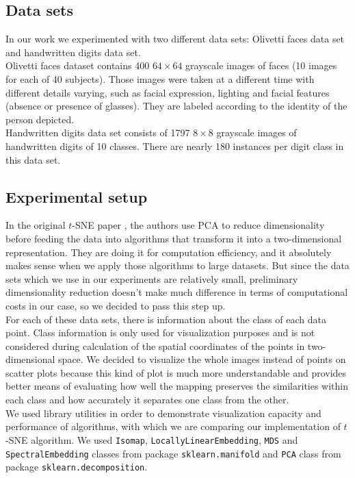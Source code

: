 \subsection{Data sets}

In our work we experimented with two different data sets: Olivetti faces data set and handwritten digits data set.\\

Olivetti faces dataset contains 400 $64 \times 64$ grayscale images of faces (10 images for each of 40 subjects). Those images were taken at a different time with different details varying, such as facial expression, lighting and facial features (absence or presence of glasses). They are labeled according to the identity of the person depicted.\\

Handwritten digits data set consists of 1797 $8 \times 8$ grayscale images of handwritten digits of 10 classes. There are nearly 180 instances per digit class in this data set.

\subsection{Experimental setup}

In the original $t$-SNE paper \cite{tsnearticle}, the authors use PCA to reduce dimensionality before feeding the data into algorithms that transform it into a two-dimensional representation. They are doing it for computation efficiency, and it absolutely makes sense when we apply those algorithms to large datasets. But since the data sets which we use in our experiments are relatively small, preliminary dimensionality reduction doesn't make much difference in terms of computational costs in our case, so we decided to pass this step up.\\

For each of these data sets, there is information about the class of each data point. Class information is only used for visualization purposes and is not considered during calculation of the spatial coordinates of the points in two-dimensional space. We decided to visualize the whole images instead of points on scatter plots because this kind of plot is much more understandable and provides better means of evaluating how well the mapping preserves the similarities within each class and how accurately it separates one class from the other.\\

We used library utilities in order to demonstrate visualization capacity and performance of algorithms, with which we are comparing our implementation of $t$-SNE algorithm. We used \texttt{Isomap}, \texttt{LocallyLinearEmbedding}, \texttt{MDS} and \texttt{SpectralEmbedding} classes from package \texttt{sklearn.manifold} and \texttt{PCA} class from package \texttt{sklearn.decomposition}.\\

